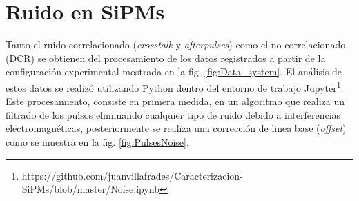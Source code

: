 \section{Ruido en SiPMs}
Tanto el ruido correlacionado (\textit{crosstalk} y \textit{afterpulses}) como el no correlacionado (DCR) se obtienen del procesamiento de los datos registrados a partir de la configuración experimental mostrada en la fig. \ref{fig:Data_system}. El análisis de estos datos se realizó utilizando Python dentro del entorno de trabajo Jupyter\footnote{https://github.com/juanvillafrades/Caracterizacion-SiPMs/blob/master/Noise.ipynb}. Este procesamiento, consiste en primera medida, en un algoritmo que realiza un filtrado de los pulsos eliminando cualquier tipo de ruido debido a interferencias electromagnéticas, posteriormente se realiza una corrección de linea base (\textit{offset}) como se muestra en la fig. \ref{fig:PulsesNoise}.  

